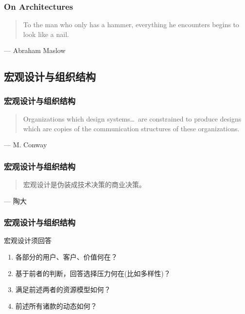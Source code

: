 \documentclass[UTF8,lualatex]{ctexbeamer}
\newcommand{\pagequote}[2]{
  \Large
  \begin{quotation}
      #1
  \end{quotation}
  \flushright\normalsize --- {#2}
}
\begin{document}
\begin{frame}
    \frametitle{On Architectures}
    \pagequote{To the man who only has a hammer, everything he encounters begins to look like a nail.}{Abraham Maslow}
\end{frame}


\subsection{宏观设计与组织结构}

\begin{frame}
    \frametitle{宏观设计与组织结构}
    \pagequote{
        Organizations which design systems\ldots~are constrained to produce designs
        which are copies of the communication structures of these organizations.}
        {M. Conway}
\end{frame}

\begin{frame}
    \frametitle{宏观设计与组织结构}
    \pagequote{宏观设计是伪装成技术决策的商业决策。}{陶大}
\end{frame}

\begin{frame}
    \frametitle{宏观设计与组织结构}
    \begin{block}{宏观设计须回答}
        \begin{enumerate}
            \item 各部分的用户、客户、价值何在？
            \item 基于前者的判断，回答选择压力何在(比如多样性)？
            \item 满足前述两者的资源模型如何？
            \item 前述所有诸款的动态如何？
        \end{enumerate}
    \end{block}
\end{frame}
\end{document}
